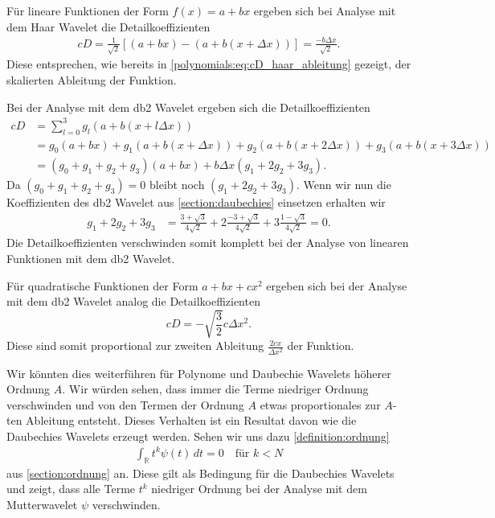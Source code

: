 \begin{refsection}
Für lineare Funktionen der Form $f(x) = a + b x$ ergeben sich bei Analyse mit
dem Haar Wavelet die Detailkoeffizienten
\begin{align*}
    cD = \frac{1}{\sqrt{2}} [ (a + b x) - (a + b (x + \Delta x)) ]
    = \frac{- b \Delta x}{\sqrt{2}}.
\end{align*}
Diese entsprechen, wie bereits in \cref{polynomials:eq:cD_haar_ableitung}
gezeigt, der skalierten Ableitung der Funktion.

Bei der Analyse mit dem db2 Wavelet ergeben sich die Detailkoeffizienten
\begin{align*}
    cD &= \sum_{l=0}^{3} g_l (a + b (x + l\Delta x)) \\
       &= g_0 (a + b x) + g_1 (a + b (x + \Delta x)) + g_2 (a + b (x + 2 \Delta x)) + g_3 (a + b (x + 3 \Delta x)) \\
       &= (g_0 + g_1 + g_2 + g_3) (a + bx) + b \Delta x (g_1 + 2 g_2 + 3 g_3).
\end{align*}
Da $(g_0 + g_1 + g_2 + g_3) = 0$ bleibt noch $(g_1 + 2 g_2 + 3 g_3)$. Wenn wir
nun die Koeffizienten des db2 Wavelet aus \cref{section:daubechies} einsetzen
erhalten wir
\begin{align*}
    g_1 + 2 g_2 + 3 g_3 &= \frac{3 + \sqrt{3}}{4\sqrt{2}} + 2 \frac{-3 + \sqrt{3}}{4\sqrt{2}} + 3 \frac{1 - \sqrt{3}}{4\sqrt{2}} = 0.
\end{align*}
Die Detailkoeffizienten verschwinden somit komplett bei der Analyse von
linearen Funktionen mit dem db2 Wavelet.

Für quadratische Funktionen der Form $a + bx + cx^2$ ergeben sich bei der
Analyse mit dem db2 Wavelet analog die Detailkoeffizienten \[cD =
-\sqrt{\frac{3}{2}} c \Delta x^2.\] Diese sind somit proportional zur zweiten
Ableitung $\frac{2c x}{\Delta x^2}$ der Funktion.

Wir könnten dies weiterführen für Polynome und Daubechie Wavelets höherer
Ordnung $A$. Wir würden sehen, dass immer die Terme niedriger Ordnung
verschwinden und von den Termen der Ordnung $A$ etwas proportionales zur
$A$-ten Ableitung entsteht. Dieses Verhalten ist ein Resultat davon wie die
Daubechies Wavelets erzeugt werden. Sehen wir uns dazu
\cref{definition:ordnung}
\begin{align*}
    \int_{\mathbb R} t^k\psi(t)\,dt=0\quad \text{für $k<N$}
\end{align*}
aus \cref{section:ordnung} an. Diese gilt als Bedingung für die Daubechies
Wavelets und zeigt, dass alle Terme $t^k$ niedriger Ordnung bei der Analyse mit
dem Mutterwavelet $\psi$ verschwinden.


\end{refsection}
